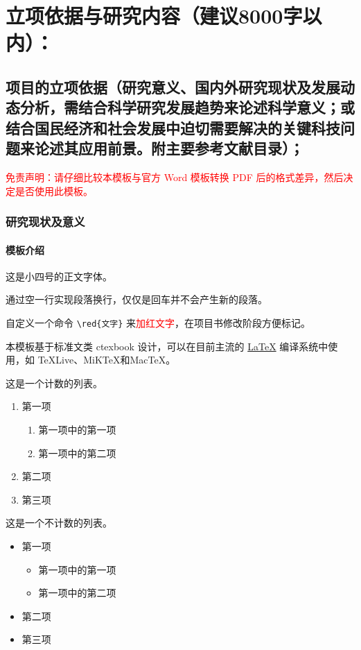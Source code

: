\documentclass[GP]{nsfc}
\newcommand{\red}[1]{\textcolor{red}{#1}}
\begin{document}
\maketitlepage

\chapter{\textbf{立项依据与研究内容（建议\textnormal{\textsf{8000}}字以内）：}}
\section{\textbf{项目的立项依据}（研究意义、国内外研究现状及发展动态分析，需结合科学研究发展趋势来论述科学意义；或结合国民经济和社会发展中迫切需要解决的关键科技问题来论述其应用前景。附主要参考文献目录）；}

\red{免责声明：请仔细比较本模板与官方 Word 模板转换 PDF 后的格式差异，然后决定是否使用此模板。}

\subsection{研究现状及意义}

\subsubsection{模板介绍}

这是小四号的正文字体。

通过空一行实现段落换行，仅仅是回车并不会产生新的段落。

自定义一个命令 \verb|\red{文字}| 来\red{加红文字}，在项目书修改阶段方便标记。

本模板基于标准文类 ctexbook 设计，可以在目前主流的 \href{https://en.wikibooks.org/wiki/LaTeX/Introduction}{\LaTeX{}} 编译系统中使用，如 \TeX{}Live、MiK\TeX{}和Mac\TeX{}。

这是一个计数的列表。
\begin{enumerate}
  \item 第一项
    \begin{enumerate}
      \item 第一项中的第一项
      \item 第一项中的第二项
    \end{enumerate}
  \item 第二项
  \item 第三项
\end{enumerate}

这是一个不计数的列表。
\begin{itemize}
  \item 第一项
  \begin{itemize}
    \item 第一项中的第一项
    \item 第一项中的第二项
  \end{itemize}
  \item 第二项
  \item 第三项
\end{itemize}
\end{document}
